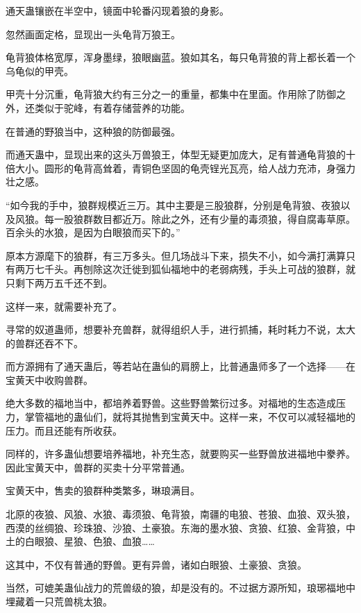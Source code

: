 
\begin{this_body}



通天蛊镶嵌在半空中，镜面中轮番闪现着狼的身影。

忽然画面定格，显现出一头龟背万狼王。

龟背狼体格宽厚，浑身墨绿，狼眼幽蓝。狼如其名，每只龟背狼的背上都长着一个乌龟似的甲壳。

甲壳十分沉重，龟背狼大约有三分之一的重量，都集中在里面。作用除了防御之外，还类似于驼峰，有着存储营养的功能。

在普通的野狼当中，这种狼的防御最强。

而通天蛊中，显现出来的这头万兽狼王，体型无疑更加庞大，足有普通龟背狼的十倍大小。圆形的龟背高耸着，青铜色坚固的龟壳锃光瓦亮，给人战力充沛，身强力壮之感。

“如今我的手中，狼群规模近三万。其中主要是三股狼群，分别是龟背狼、夜狼以及风狼。每一股狼群数目都近万。除此之外，还有少量的毒须狼，得自腐毒草原。百余头的水狼，是因为白眼狼而买下的。”

原本方源麾下的狼群，有三万多头。但几场战斗下来，损失不小，如今满打满算只有两万七千头。再刨除这次迁徙到狐仙福地中的老弱病残，手头上可战的狼群，就只剩下两万五千还不到。

这样一来，就需要补充了。

寻常的奴道蛊师，想要补充兽群，就得组织人手，进行抓捕，耗时耗力不说，太大的兽群还吞不下。

而方源拥有了通天蛊后，等若站在蛊仙的肩膀上，比普通蛊师多了一个选择——在宝黄天中收购兽群。

绝大多数的福地当中，都培养着野兽。这些野兽繁衍过多。对福地的生态造成压力，掌管福地的蛊仙们，就将其抛售到宝黄天中。这样一来，不仅可以减轻福地的压力。而且还能有所收获。

同样的，许多蛊仙想要培养福地，补充生态，就要购买一些野兽放进福地中豢养。因此宝黄天中，兽群的买卖十分平常普通。

宝黄天中，售卖的狼群种类繁多，琳琅满目。

北原的夜狼、风狼、水狼、毒须狼、龟背狼，南疆的电狼、苍狼、血狼、双头狼，西漠的丝绸狼、珍珠狼、沙狼、土豪狼。东海的墨水狼、贪狼、红狼、金背狼，中土的白眼狼、星狼、色狼、血狼……

这其中，不仅有普通的野兽。更有异兽，诸如白眼狼、土豪狼、贪狼。

当然，可媲美蛊仙战力的荒兽级的狼，却是没有的。不过据方源所知，琅琊福地中埋藏着一只荒兽桃太狼。


\end{this_body}
